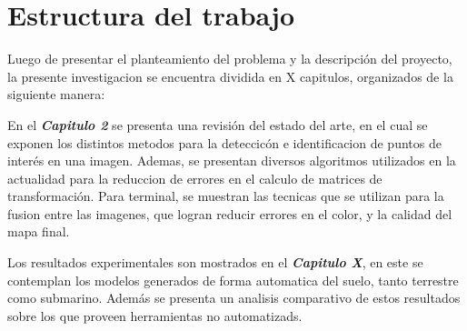 \section{Estructura del trabajo}

Luego de presentar el planteamiento del problema y la descripción del proyecto, la presente investigacion se encuentra dividida en X capitulos, organizados de la siguiente manera:

En el \textit{\textbf{Capitulo 2}} se presenta una revisión del estado del arte, en el cual se exponen los distintos metodos para la deteccicón e identificacion de puntos de interés en una imagen. Ademas, se presentan diversos algoritmos utilizados en la actualidad para la reduccion de errores en el calculo de matrices de transformación. Para terminal, se muestran las tecnicas que se utilizan para la fusion entre las imagenes, que logran reducir errores en el color, y la calidad del mapa final.

Los resultados experimentales son mostrados en el \textit{\textbf{Capitulo X}}, en este se contemplan los modelos generados de forma automatica del suelo, tanto terrestre como submarino. Además se presenta un analisis comparativo de estos resultados sobre los que proveen herramientas no automatizads.